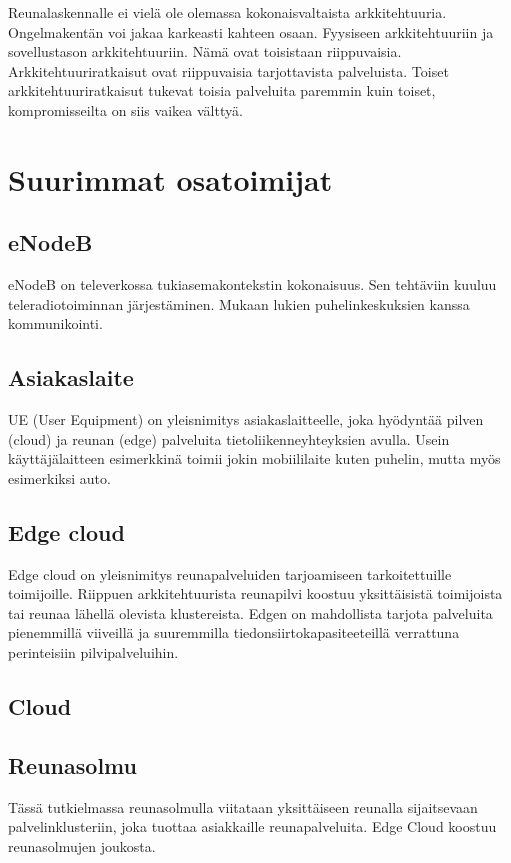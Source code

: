 \documentclass[finnish]{tktltiki2}
\theoremstyle{definition}
\theoremstyle{remark}
\begin{document}
Reunalaskennalle ei vielä ole olemassa kokonaisvaltaista arkkitehtuuria.
Ongelmakentän voi jakaa karkeasti kahteen osaan. Fyysiseen arkkitehtuuriin ja sovellustason arkkitehtuuriin. Nämä ovat toisistaan riippuvaisia.
Arkkitehtuuriratkaisut ovat riippuvaisia tarjottavista palveluista. Toiset arkkitehtuuriratkaisut tukevat toisia palveluita paremmin kuin toiset, kompromisseilta on siis vaikea välttyä.






\section{Suurimmat osatoimijat}
\subsection{eNodeB}
eNodeB on televerkossa tukiasemakontekstin kokonaisuus. Sen tehtäviin kuuluu teleradiotoiminnan järjestäminen. Mukaan lukien puhelinkeskuksien kanssa kommunikointi.

\subsection{Asiakaslaite}
UE (User Equipment) on yleisnimitys asiakaslaitteelle, joka hyödyntää pilven (cloud) ja reunan (edge) palveluita tietoliikenneyhteyksien avulla.
Usein käyttäjälaitteen esimerkkinä toimii jokin mobiililaite kuten puhelin, mutta myös esimerkiksi auto. 

\subsection{Edge cloud}
Edge cloud on yleisnimitys reunapalveluiden tarjoamiseen tarkoitettuille toimijoille.
Riippuen arkkitehtuurista reunapilvi koostuu yksittäisistä toimijoista tai reunaa lähellä olevista klustereista.
Edgen on mahdollista tarjota palveluita pienemmillä viiveillä ja suuremmilla tiedonsiirtokapasiteeteillä verrattuna perinteisiin pilvipalveluihin. 

\subsection{Cloud}

\subsection{Reunasolmu}
Tässä tutkielmassa reunasolmulla viitataan yksittäiseen reunalla sijaitsevaan
palvelinklusteriin, joka tuottaa asiakkaille reunapalveluita. Edge Cloud koostuu reunasolmujen joukosta.
\end{document}
